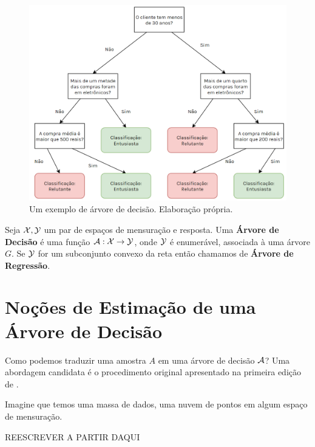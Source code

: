 \begin{figure}
    \centering
    \includegraphics[scale = .55]{imagens/arvore.png}
    \caption{Um exemplo de árvore de decisão. Elaboração própria.}
    \label{fig:arvore}
\end{figure}


\begin{defi}
Seja $\mathcal{X}, \mathcal{Y}$ um par de espaços de mensuração e resposta. Uma \textbf{Árvore de Decisão} é uma função $\mathcal{A}: \mathcal{X} \to \mathcal{Y}$, onde $\mathcal{Y}$ é enumerável, associada à uma árvore $G$. Se $\mathcal{Y}$ for um subconjunto convexo da reta então chamamos de \textbf{Árvore de Regressão}.
\end{defi}






\section{Noções de Estimação de uma Árvore de Decisão}

Como podemos traduzir uma amostra $A$ em uma árvore de decisão $\mathcal{A}$? Uma abordagem candidata é o procedimento original apresentado na primeira edição de .

Imagine que temos uma massa de dados, uma nuvem de pontos em algum espaço de mensuração. 

REESCREVER A PARTIR DAQUI


